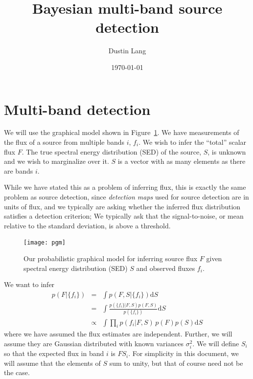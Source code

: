 \documentclass[letterpaper,preprint]{aastex}
\newcommand{\fig}{Figure}
\newcommand{\figref}[1]{\mbox{\fig~\ref{#1}}}
\begin{document}
\title{Bayesian multi-band source detection}
\author{Dustin Lang}
\date{\today}
\maketitle

\section{Multi-band detection}

We will use the graphical model shown in \figref{model}.  We have
measurements of the flux of a source from multiple bands $i$, $f_i$.
We wish to infer the ``total'' scalar flux $F$.  The true spectral
energy distribution (SED) of the source, $S$, is unknown and we wish
to marginalize over it.  $S$ is a vector with as many elements as
there are bands $i$.

While we have stated this as a problem of inferring flux, this is
exactly the same problem as source detection, since \emph{detection
  maps} used for source detection are in units of flux, and we
typically are asking whether the inferred flux distribution satisfies
a detection criterion; We typically ask that the signal-to-noise, or
mean relative to the standard deviation, is above a threshold.

\begin{figure}[h!]
\begin{center}
\texttt{[image: pgm]}
\end{center}
\caption{Our probabilistic graphical model for inferring source flux
  $F$ given spectral energy distribution (SED) $S$ and observed fluxes
  $f_i$.\label{model}}
\end{figure}

\newcommand{\setfi}{\{ f_i \}}
\newcommand{\dd}{\textrm{d}}

We want to infer
\begin{eqnarray}
  p(F | \setfi) &=& \int p(F, S | \setfi) \dd S \\
  &=& \int \frac{p(\setfi | F, S) p(F, S)}{p(\setfi)} \dd S \\
  &\propto& \int \prod_i p(f_i | F,S) \, p(F) p(S) \dd S
\end{eqnarray}
where we have assumed the flux estimates are independent.  Further, we
will assume they are Gaussian distributed with known variances
$\sigma_i^2$.  We will define $S_i$ so that the expected flux in band
$i$ is $F S_i$.  For simplicity in this document, we will assume that
the elements of $S$ sum to unity, but that of course need not be the
case.
\end{document}
